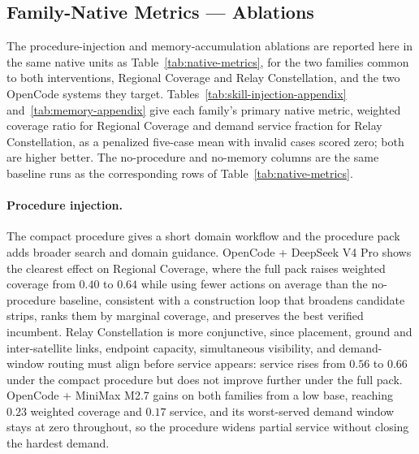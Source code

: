\documentclass[]{mosi}
\begin{document}
\subsection{Family-Native Metrics --- Ablations}

The procedure-injection and memory-accumulation ablations are reported here in the same native units as Table~\ref{tab:native-metrics}, for the two families common to both interventions, Regional Coverage and Relay Constellation, and the two OpenCode systems they target. Tables~\ref{tab:skill-injection-appendix} and~\ref{tab:memory-appendix} give each family's primary native metric, weighted coverage ratio for Regional Coverage and demand service fraction for Relay Constellation, as a penalized five-case mean with invalid cases scored zero; both are higher better. The no-procedure and no-memory columns are the same baseline runs as the corresponding rows of Table~\ref{tab:native-metrics}.

\paragraph{Procedure injection.}
The compact procedure gives a short domain workflow and the procedure pack adds broader search and domain guidance. OpenCode + DeepSeek V4 Pro shows the clearest effect on Regional Coverage, where the full pack raises weighted coverage from $0.40$ to $0.64$ while using fewer actions on average than the no-procedure baseline, consistent with a construction loop that broadens candidate strips, ranks them by marginal coverage, and preserves the best verified incumbent. Relay Constellation is more conjunctive, since placement, ground and inter-satellite links, endpoint capacity, simultaneous visibility, and demand-window routing must align before service appears: service rises from $0.56$ to $0.66$ under the compact procedure but does not improve further under the full pack. OpenCode + MiniMax M2.7 gains on both families from a low base, reaching $0.23$ weighted coverage and $0.17$ service, and its worst-served demand window stays at zero throughout, so the procedure widens partial service without closing the hardest demand.
\end{document}
